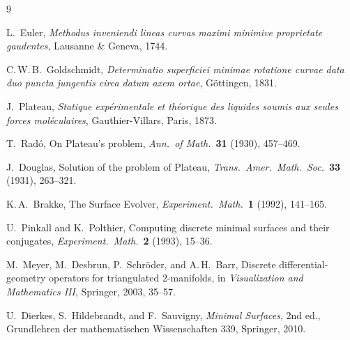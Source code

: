 \documentclass[11pt,a4paper]{article}
\begin{document}
\begin{thebibliography}{9}\small

 L.~Euler,
\emph{Methodus inveniendi lineas curvas maximi minimive proprietate
gaudentes}, Lausanne \& Geneva, 1744.

 C.\,W.\,B.~Goldschmidt,
\emph{Determinatio superficiei minimae rotatione curvae data duo puncta
jungentis circa datum axem ortae}, G\"ottingen, 1831.

 J.~Plateau,
\emph{Statique exp\'erimentale et th\'eorique des liquides soumis aux seules
forces mol\'eculaires}, Gauthier-Villars, Paris, 1873.

 T.~Rad\'o,
On Plateau's problem, \emph{Ann.\ of Math.}\ \textbf{31} (1930), 457--469.

 J.~Douglas,
Solution of the problem of Plateau, \emph{Trans.\ Amer.\ Math.\ Soc.}\
\textbf{33} (1931), 263--321.

 K.\,A.~Brakke,
The Surface Evolver, \emph{Experiment.\ Math.}\ \textbf{1} (1992), 141--165.

 U.~Pinkall and K.~Polthier,
Computing discrete minimal surfaces and their conjugates,
\emph{Experiment.\ Math.}\ \textbf{2} (1993), 15--36.

 M.~Meyer, M.~Desbrun, P.~Schr\"oder, and A.\,H.~Barr,
Discrete differential-geometry operators for triangulated 2-manifolds, in
\emph{Visualization and Mathematics III}, Springer, 2003, 35--57.

 U.~Dierkes, S.~Hildebrandt, and F.~Sauvigny,
\emph{Minimal Surfaces}, 2nd ed., Grundlehren der mathematischen
Wissenschaften 339, Springer, 2010.

\end{thebibliography}
\end{document}
